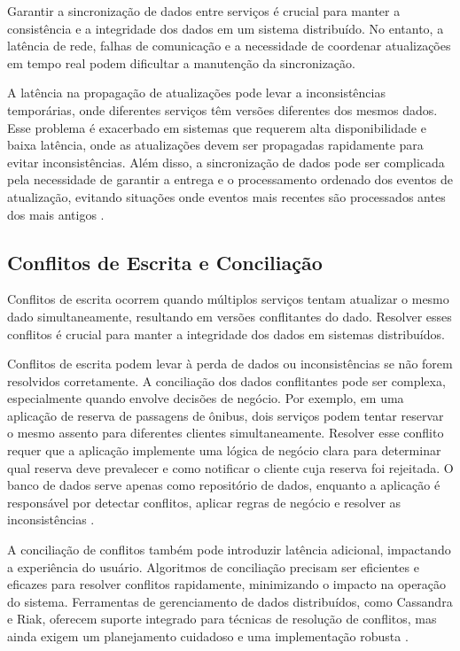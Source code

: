 Garantir a sincronização de dados entre serviços é crucial para manter a consistência e a integridade dos dados em um sistema distribuído. No entanto, a latência de rede, falhas de comunicação e a necessidade de coordenar atualizações em tempo real podem dificultar a manutenção da sincronização.

A latência na propagação de atualizações pode levar a inconsistências temporárias, onde diferentes serviços têm versões diferentes dos mesmos dados. Esse problema é exacerbado em sistemas que requerem alta disponibilidade e baixa latência, onde as atualizações devem ser propagadas rapidamente para evitar inconsistências. Além disso, a sincronização de dados pode ser complicada pela necessidade de garantir a entrega e o processamento ordenado dos eventos de atualização, evitando situações onde eventos mais recentes são processados antes dos mais antigos \cite{pritchett2008}.

\subsection{Conflitos de Escrita e Conciliação}

Conflitos de escrita ocorrem quando múltiplos serviços tentam atualizar o mesmo dado simultaneamente, resultando em versões conflitantes do dado. Resolver esses conflitos é crucial para manter a integridade dos dados em sistemas distribuídos.

Conflitos de escrita podem levar à perda de dados ou inconsistências se não forem resolvidos corretamente. A conciliação dos dados conflitantes pode ser complexa, especialmente quando envolve decisões de negócio. Por exemplo, em uma aplicação de reserva de passagens de ônibus, dois serviços podem tentar reservar o mesmo assento para diferentes clientes simultaneamente. Resolver esse conflito requer que a aplicação implemente uma lógica de negócio clara para determinar qual reserva deve prevalecer e como notificar o cliente cuja reserva foi rejeitada. O banco de dados serve apenas como repositório de dados, enquanto a aplicação é responsável por detectar conflitos, aplicar regras de negócio e resolver as inconsistências \cite{vogels2009}.

A conciliação de conflitos também pode introduzir latência adicional, impactando a experiência do usuário. Algoritmos de conciliação precisam ser eficientes e eficazes para resolver conflitos rapidamente, minimizando o impacto na operação do sistema. Ferramentas de gerenciamento de dados distribuídos, como Cassandra e Riak, oferecem suporte integrado para técnicas de resolução de conflitos, mas ainda exigem um planejamento cuidadoso e uma implementação robusta \cite{lakshman2010}.

